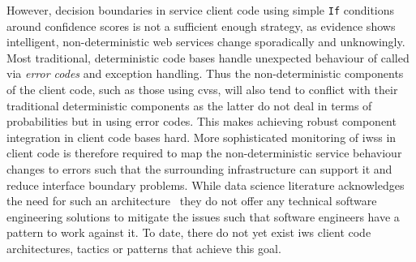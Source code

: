 
However, decision boundaries in service client code using simple \texttt{If} conditions around confidence scores is not a sufficient enough strategy, as evidence shows intelligent, non-deterministic web services change sporadically and unknowingly. Most traditional, deterministic code bases handle unexpected behaviour of called  via \textit{error codes} and exception handling. Thus the non-deterministic components of the client code, such as those using \glspl{cvs}, will also tend to conflict with their traditional deterministic components as the latter do not deal in terms of probabilities but in using error codes. 
This makes achieving robust component integration in client code bases hard.
More sophisticated monitoring of \glspl{iws} in client code is therefore required to map the non-deterministic service behaviour changes to errors such that the surrounding infrastructure can support it and reduce interface boundary problems. While data science literature acknowledges the need for such an architecture~\citep{10.1007/978-3-319-08976-8_16} they do not offer any technical software engineering solutions to mitigate the issues such that software engineers have a pattern to work against it. To date, there do not yet exist \gls{iws} client code architectures, tactics or patterns that achieve this goal.

